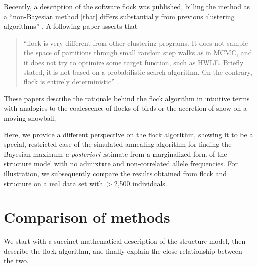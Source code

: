 Recently, a description of the software {\sc flock} was published, 
billing the method as a ``non-Bayesian method [that] 
differs substantially from previous 
clustering algorithms'' \citep[][p.~1333]{Duc&Tur2009}. A following
paper asserts that
\begin{quote}
``{\sc flock} is very different from  other clustering 
programs. It does not sample the space of partitions through small 
random step walks as in MCMC, and it does not try to optimize some 
target function, such as HWLE\@. Briefly stated, it is not based on a 
probabilistic search algorithm. On the contrary, {\sc flock} is 
entirely deterministic'' \citep[][p.~736]{Duc&Tur2012}.
\end{quote}
These papers describe the rationale behind the {\sc flock} algorithm in
intuitive terms with analogies to the coalescence of flocks of birds
or the accretion of snow on a moving snowball, \etc  

Here, we provide a different perspective on the {\sc flock} algorithm,
showing it to be a special, restricted case of the simulated annealing
algorithm for finding the Bayesian maximum {\em a posteriori}
estimate from a marginalized form of the {\sc structure} model with no
admixture and non-correlated allele frequencies.  For illustration, we subsequently compare
the results obtained from {\sc flock} and {\sc structure} on a real data
set with $>$2,500 individuals.

\section*{Comparison of methods}
We start with a succinct mathematical description of the {\sc structure}
model, then describe the {\sc flock} algorithm, and finally explain
the close relationship between the two.


